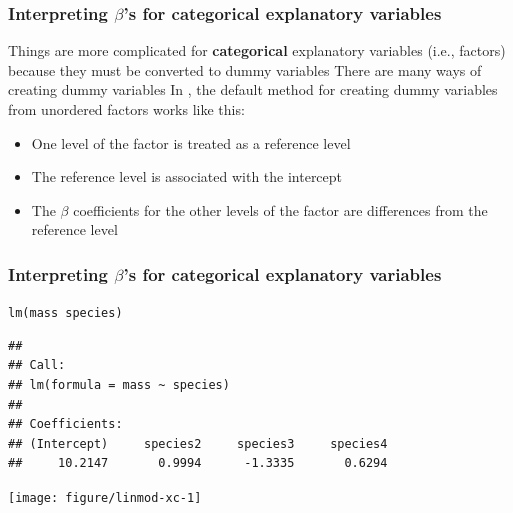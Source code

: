 \documentclass[color=usenames,dvipsnames]{beamer}\usepackage[]{graphicx}\usepackage[]{color}
\makeatletter
\newcommand{\hlopt}[1]{\textcolor[rgb]{0,0,0}{#1}}%
\newcommand{\hlstd}[1]{\textcolor[rgb]{0,0,0}{#1}}%
\newcommand{\hlkwd}[1]{\textcolor[rgb]{0.004,0.004,0.506}{#1}}%
\newenvironment{kframe}{%
 \def\at@end@of@kframe{}%
 \ifinner\ifhmode%
  \def\at@end@of@kframe{\end{minipage}}%
  \begin{minipage}{\columnwidth}%
 \fi\fi%
 \def\FrameCommand##1{\hskip\@totalleftmargin \hskip-\fboxsep
 \colorbox{shadecolor}{##1}\hskip-\fboxsep
     \hskip-\linewidth \hskip-\@totalleftmargin \hskip\columnwidth}%
 \MakeFramed {\advance\hsize-\width
   \@totalleftmargin\z@ \linewidth\hsize
   \@setminipage}}%
 {\par\unskip\endMakeFramed%
 \at@end@of@kframe}
\newenvironment{knitrout}{}{} %
\newcommand{\inr}[1]{\colorbox{inlinecolor}{\texttt{#1}}}
\makeatother
\begin{document}
\begin{frame}[fragile]
  \frametitle{\small Interpreting $\beta$'s for categorical explanatory variables}
  Things are more complicated for {\bf categorical} explanatory
  variables (i.e., factors) because they must be converted to dummy
  variables
  \pause
  \vfill
  There are many ways of creating dummy variables
  \pause
  \vfill
  In \R, the default method for creating dummy variables from
  unordered factors works like
  this: %
  \begin{itemize}
    \item One level of the factor is treated as a \alert{reference level}
    \item The reference level is associated with the intercept
    \item The $\beta$ coefficients for the other levels of the factor
      are differences from the reference level
  \end{itemize}
\end{frame}





\begin{frame}[fragile]
  \frametitle{\small Interpreting $\beta$'s for categorical explanatory variables}
\small 

\centering
\begin{knitrout}\tiny
{}\color{fgcolor}\begin{kframe}
\begin{alltt}
\hlkwd{lm}\hlstd{(mass}\hlopt{~}\hlstd{species)}
\end{alltt}
\begin{verbatim}
## 
## Call:
## lm(formula = mass ~ species)
## 
## Coefficients:
## (Intercept)     species2     species3     species4  
##     10.2147       0.9994      -1.3335       0.6294
\end{verbatim}
\end{kframe}
\end{knitrout}
  \texttt{[image: figure/linmod-xc-1]} \\
\end{frame}
\end{document}
